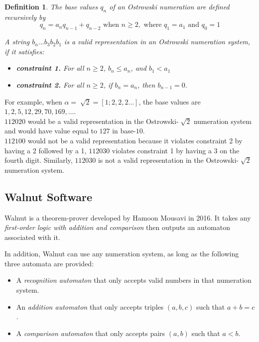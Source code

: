 \documentclass[landscape]{sciposter}
\newtheorem*{definition}{Definition}
\begin{document}
\begin{multicols}{3}
\begin{definition}
The base values $q_{n}$ of an Ostrowski numeration are defined recursively by{
\setlength{\abovedisplayskip}{3pt}
\setlength{\belowdisplayskip}{3pt}
$$q_{n}=a_{n}q_{n-1}+q_{n-2} \text{ when } n \ge 2, \text{ where } q_{1}=a_1 \text{ and } q_{0}=1$$}

A string $b_n\dots b_3b_2b_1$ is a valid representation in an Ostrowski numeration system, if it satisfies:
\begin{itemize}
\item \textbf{constraint 1.} For all $n\ge 2$, $b_n\le a_n$, and $b_1 < a_1$
\item \textbf{constraint 2.} For all $n\ge 2$, if $b_{n} = a_{n}$, then $b_{n-1} = 0$.
\end{itemize}
\end{definition}

For example, when $\alpha = \sqrt[~]{2} = [1;2,2,2\dots]$, the base values are $1, 2, 5, 12, 29, 70, 169, \dots$.\\
$112020$ would be a valid representation in the Ostrowski-$\sqrt[~]{2}$ numeration system and would have value equal to $127$ in base-$10$.\\
$112100$ would not be a valid representation because it violates constraint 2 by having a 2 followed by a 1, $112030$ violates constraint 1 by having a 3 on the fourth digit. 
Similarly, $112030$ is not a valid representation in the Ostrowski-$\sqrt[~]{2}$ numeration system.\\

\begin{mdframed}[style=MyFrame]
\subsection*{Walnut Software}
\end{mdframed}

Walnut is a theorem-prover developed by Hamoon Mousavi in 2016. 
It takes any \emph{first-order logic with addition and comparison} then outputs an automaton associated with it. 

In addition, Walnut can use any numeration system, as long as the following three automata are provided:
\begin{itemize}
\item A \emph{recognition automaton} that only accepts valid numbers in that numeration system.
\item An \emph{addition automaton} that only accepts triples $(a,b,c)$ such that $a+b=c$.
\item A \emph{comparison automaton} that only accepts pairs $(a,b)$ such that $a<b$.
\end{itemize}


\end{multicols}
\end{document}

